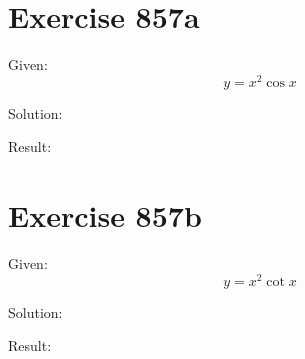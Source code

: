 \documentclass[a4paper, 10pt]{scrartcl}
\begin{document}
\section{Exercise 857a}

Given:
\[
y = x^{2}\cos{x}
\]

Solution:

Result:

\section{Exercise 857b}

Given:
\[
y = x^{2}\cot{x}
\]

Solution:

Result:
\end{document}
